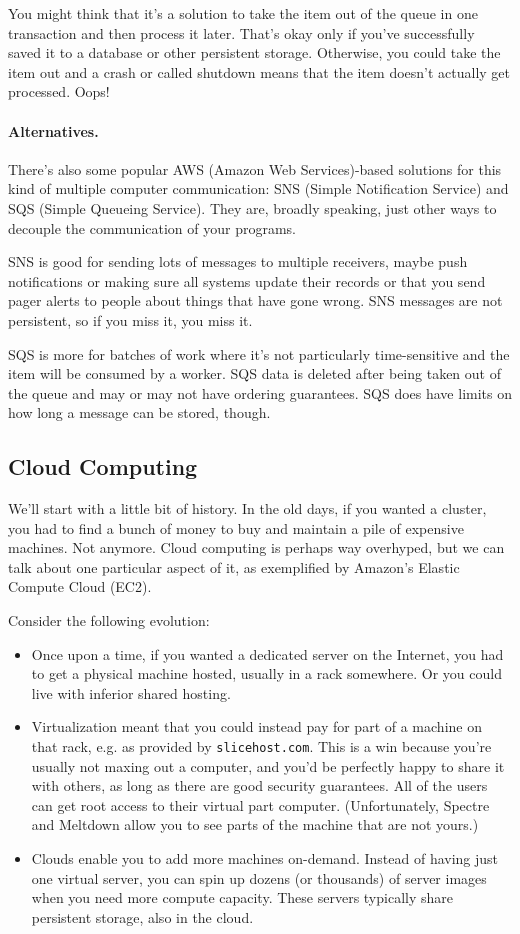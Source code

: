 \documentclass[a4paper]{report}
\begin{document}
You might think that it's a solution to take the item out of the queue in one transaction and then process it later. That's okay only if you've successfully saved it to a database or other persistent storage. Otherwise, you could take the item out and a crash or called shutdown means that the item doesn't actually get processed. Oops!

\paragraph{Alternatives.} There's also some popular AWS (Amazon Web Services)-based solutions for this kind of multiple computer communication: SNS (Simple Notification Service) and SQS (Simple Queueing Service). They are, broadly speaking, just other ways to decouple the communication of your programs.

SNS is good for sending lots of messages to multiple receivers, maybe push notifications or making sure all systems update their records or that you send pager alerts to people about things that have gone wrong. SNS messages are not persistent, so if you miss it, you miss it. 

SQS is more for batches of work where it's not particularly time-sensitive and the item will be consumed by a worker. SQS data is deleted after being taken out of the queue and may or may not have ordering guarantees. SQS does have limits on how long a message can be stored, though. 

\subsection*{Cloud Computing}
We'll start with a little bit of history.
In the old days, if you wanted a cluster, you had to find a bunch of
money to buy and maintain a pile of expensive machines. Not anymore.
Cloud computing is perhaps way overhyped, but we can talk about 
one particular aspect of it, as exemplified by Amazon's Elastic
Compute Cloud (EC2).

Consider the following evolution:
\begin{itemize}
\item Once upon a time, if you wanted a dedicated server on the
  Internet, you had to get a physical machine hosted, usually in a
  rack somewhere. Or you could live with inferior shared hosting.
\item Virtualization meant that you could instead pay for part of a
  machine on that rack, e.g. as provided by {\tt slicehost.com}.  This
  is a win because you're usually not maxing out a computer, and you'd
  be perfectly happy to share it with others, as long as there are
  good security guarantees. All of the users can get root access to their virtual part computer.
  (Unfortunately, Spectre and Meltdown allow you to see parts of the machine that are not yours.)
\item Clouds enable you to add more machines on-demand. Instead of
  having just one virtual server, you can spin up dozens (or
  thousands) of server images when you need more compute
  capacity. These servers typically share persistent storage, also in
  the cloud. 
\end{itemize}
\end{document}
